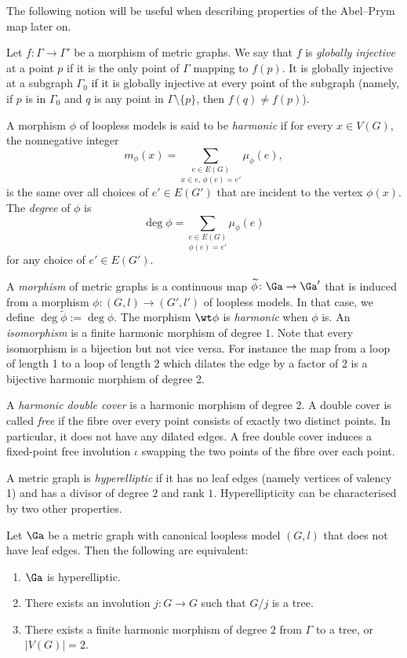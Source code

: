 The following notion will be useful when describing properties of the Abel--Prym map later on.


\begin{defi}\label{def:injectivity}
 Let $f:\Gamma\to\Gamma'$ be a morphism of metric graphs.  We say that $f$ is \emph{globally injective} at a point $p$ if it is the only point of $\Gamma$ mapping to $f(p)$. It is globally injective at a subgraph $\Gamma_0$  if it is globally injective at every point of the subgraph (namely, if $p$ is in $\Gamma_0$ and $q$ is any point in $\Gamma\setminus\{p\}$, then $f(q)\neq f(p)$). 
\end{defi}


A morphism $\phi$ of loopless models is said to be \emph{harmonic} if for every $x\in V(G)$, the nonnegative integer 
\[
m_{\phi}(x)=\underset{x\in e, \,\phi(e)=e'}{\sum_{e\in E(G)}}\mu_{\phi}(e),
\]
is the same over all choices of $e'\in E(G')$ that are incident to the vertex $\phi(x)$.
The \emph{degree} of $\phi$ is 
\[
\deg\phi=\underset{\phi(e)=e'}{\sum_{e\in E(G)}}\mu_{\phi}(e)
\]
for any choice of $e'\in E(G')$.


A \emph{morphism} of metric graphs is a continuous   map $\widetilde\phi\colon \Ga\to \Ga'$ that is induced from a morphism $\phi\colon (G,l)\to (G',l')$ of loopless models. In that case, we define  $\deg\widetilde\phi:= \deg\phi$. The morphism $\wt\phi$ is \emph{harmonic} when $\phi$ is. An \emph{isomorphism} is a finite harmonic morphism of degree $1$. Note that every isomorphism is a bijection but not vice versa. For instance the map from a loop of length 1 to a loop of length 2 which dilates the edge by a factor of 2 is a bijective harmonic morphism of degree 2.  

A \emph{harmonic double cover} is a harmonic morphism of degree 2.
A double cover is called \emph{free} if the fibre over every point consists of exactly two distinct points. In particular, it does not have any dilated edges. A free double cover  induces a fixed-point free involution $\iota$ swapping the two points of the fibre over each point. 

A metric graph is \emph{hyperelliptic} if it has no leaf edges (namely vertices of valency 1) and has a divisor of degree $2$ and rank $1$. Hyperellipticity can be characterised by two other properties. 


\begin{theorem*}\cite[Theorem 3.13]{CH}
Let $\Ga$ be a metric graph with canonical loopless model  $(G,l)$ that does not have leaf edges. Then the following are equivalent:
\begin{enumerate}
 \item $\Ga$ is hyperelliptic.
 \item There exists an involution $j\colon G\to G$ such that $G/j$ is a tree.
 \item There exists a finite harmonic morphism of degree $2$ from $\Gamma$ to a tree, or~$|V(G)|=2$.
\end{enumerate}
\end{theorem*}

